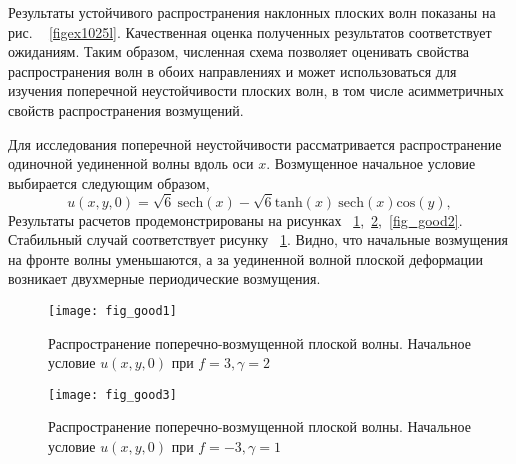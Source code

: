 Результаты устойчивого распространения наклонных плоских волн показаны на рис. ~ \ref{figex1025l}. Качественная оценка полученных результатов соответствует ожиданиям. Таким образом, численная схема позволяет оценивать свойства распространения волн в обоих направлениях и может использоваться для изучения поперечной неустойчивости плоских волн, в том числе асимметричных свойств распространения возмущений.

Для исследования поперечной неустойчивости рассматривается распространение одиночной уединенной волны вдоль оси $ x $. Возмущенное начальное условие выбирается следующим образом,
\begin{equation}
	u(x,y,0) = \sqrt{6} ~{\text{sech}}(x)-\sqrt{6}{\text{tanh}} (x) ~{\text{sech}}(x) {\text{cos}} (y),
\end{equation}
Результаты расчетов продемонстрированы на рисунках ~\ref{fig_good1},~\ref{fig_good3},~\ref{fig_good2}. 
Стабильный случай соответствует рисунку ~\ref{fig_good1}.
Видно, что начальные возмущения на фронте волны уменьшаются, а за уединенной волной плоской деформации возникает двухмерные периодические возмущения.

\begin{figure}
	\centering
	\texttt{[image: fig\_good1]}
	\caption{Распространение поперечно-возмущенной плоской волны. Начальное условие $u(x,y,0)$ при $f = 3, \gamma = 2$} \label{fig_good1}
\end{figure}

\begin{figure}
	\centering
	\texttt{[image: fig\_good3]}
	\caption{Распространение поперечно-возмущенной плоской волны. Начальное условие $u(x,y,0)$ при $f = -3, \gamma = 1$} \label{fig_good3}	
\end{figure}

